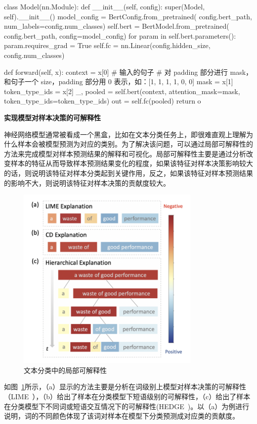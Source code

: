 \begin{python}
class Model(nn.Module):
    def __init__(self, config):
        super(Model, self).__init__()
        model_config = BertConfig.from_pretrained(
            config.bert_path, num_labels=config.num_classes)
        self.bert = BertModel.from_pretrained(
            config.bert_path, config=model_config)
        for param in self.bert.parameters():
            param.requires_grad = True
        self.fc = nn.Linear(config.hidden_size, config.num_classes)


    def forward(self, x):
        context = x[0]  # 输入的句子
        # 对 padding 部分进行 mask，和句子一个 size，padding 部分用 0 表示，如：[1, 1, 1, 1, 0, 0]
        mask = x[1]
        token_type_ids = x[2]
        _, pooled = self.bert(context, attention_mask=mask,
                            token_type_ids=token_type_ids)
        out = self.fc(pooled)
        return o
\end{python}

\noindent \textbf{实现模型对样本决策的可解释性}

\noindent 神经网络模型通常被看成一个黑盒，比如在文本分类任务上，即很难直观上理解为什么样本会被模型预测为对应的类别。为了解决该问题，可以通过局部可解释性的方法来完成模型对样本预测结果的解释和可视化。局部可解释性主要是通过分析改变样本的特征从而导致样本预测结果变化的程度，如果该特征对样本决策影响较大的话，则说明该特征对样本分类起到关键作用，反之，如果该特征对样本预测结果的影响不大，则说明该特征对样本决策的贡献度较大。\\
\begin{figure}[ht]
 \centering
 \includegraphics[height=9cm]{images/book_task3_interprete.jpg}
 \caption{文本分类中的局部可解释性~\cite{chen2020generating}}
 \label{fig:book_task3_interprete}
\end{figure}

\noindent 如图~\ref{fig:book_task3_interprete}所示，（a）显示的方法主要是分析在词级别上模型对样本决策的可解释性（LIME~\cite{DBLP:journals/corr/RibeiroSG16}），（b）给出了样本在分类模型下短语级别的可解释性，（c）给出了样本在分类模型下不同词或短语交互情况下的可解释性(HEDGE~\cite{chen2020generating})。以（a）为例进行说明，词的不同颜色体现了该词对样本在模型下分类预测成对应类的贡献度。